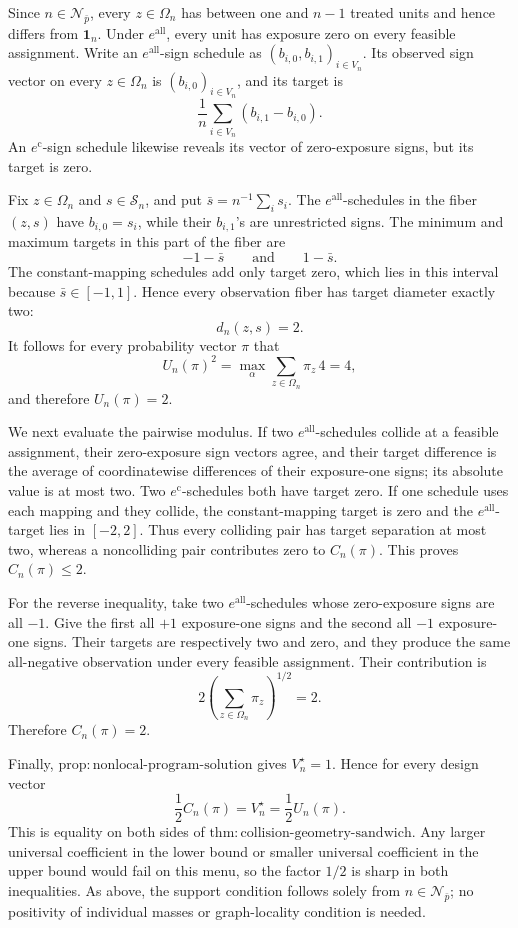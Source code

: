 Since \(n\in\mathcal N_{\bar p}\), every \(z\in\Omega_n\) has between one and \(n-1\) treated units and hence differs from \(\mathbf 1_n\).  Under \(e^{\mathrm{all}}\), every unit has exposure zero on every feasible assignment.  Write an \(e^{\mathrm{all}}\)-sign schedule as \((b_{i,0},b_{i,1})_{i\in V_n}\).  Its observed sign vector on every \(z\in\Omega_n\) is \((b_{i,0})_{i\in V_n}\), and its target is
\[
 \frac1n\sum_{i\in V_n}(b_{i,1}-b_{i,0}).
\]
An \(e^{\mathrm c}\)-sign schedule likewise reveals its vector of zero-exposure signs, but its target is zero.

Fix \(z\in\Omega_n\) and \(s\in\mathcal S_n\), and put \(\bar s=n^{-1}\sum_i s_i\).  The \(e^{\mathrm{all}}\)-schedules in the fiber \((z,s)\) have \(b_{i,0}=s_i\), while their \(b_{i,1}\)'s are unrestricted signs.  The minimum and maximum targets in this part of the fiber are
\[
 -1-\bar s
 \qquad\text{and}\qquad
 1-\bar s.
\]
The constant-mapping schedules add only target zero, which lies in this interval because \(\bar s\in[-1,1]\).  Hence every observation fiber has target diameter exactly two:
\[
 d_n(z,s)=2.
\]
It follows for every probability vector \(\pi\) that
\[
 U_n(\pi)^2
 =\max_\alpha\sum_{z\in\Omega_n}\pi_z\,4
 =4,
\]
and therefore \(U_n(\pi)=2\).

We next evaluate the pairwise modulus.  If two \(e^{\mathrm{all}}\)-schedules collide at a feasible assignment, their zero-exposure sign vectors agree, and their target difference is the average of coordinatewise differences of their exposure-one signs; its absolute value is at most two.  Two \(e^{\mathrm c}\)-schedules both have target zero.  If one schedule uses each mapping and they collide, the constant-mapping target is zero and the \(e^{\mathrm{all}}\)-target lies in \([-2,2]\).  Thus every colliding pair has target separation at most two, whereas a noncolliding pair contributes zero to \(C_n(\pi)\).  This proves \(C_n(\pi)\le2\).

For the reverse inequality, take two \(e^{\mathrm{all}}\)-schedules whose zero-exposure signs are all \(-1\).  Give the first all \(+1\) exposure-one signs and the second all \(-1\) exposure-one signs.  Their targets are respectively two and zero, and they produce the same all-negative observation under every feasible assignment.  Their contribution is
\[
 2\left(\sum_{z\in\Omega_n}\pi_z\right)^{1/2}=2.
\]
Therefore \(C_n(\pi)=2\).

Finally, \(\mathrm{prop{:}nonlocal\text{-}program\text{-}solution}\) gives \(V_n^\star=1\).  Hence for every design vector
\[
 \frac12C_n(\pi)=V_n^\star=\frac12U_n(\pi).
\]
This is equality on both sides of \(\mathrm{thm{:}collision\text{-}geometry\text{-}sandwich}\).  Any larger universal coefficient in the lower bound or smaller universal coefficient in the upper bound would fail on this menu, so the factor \(1/2\) is sharp in both inequalities.  As above, the support condition follows solely from \(n\in\mathcal N_{\bar p}\); no positivity of individual masses or graph-locality condition is needed.